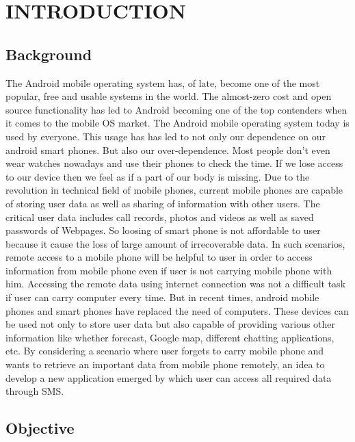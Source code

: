 

\chapter{INTRODUCTION}




\section{Background}

\hspace{0.9cm} The Android mobile operating system has, of late, become one of the most popular, free and usable systems in the world. The almost-zero cost and open source functionality has led to Android becoming one of the top contenders when it comes to the mobile OS market.
The Android mobile operating system today is used by everyone. This usage has has led to not only our dependence on our android smart phones. But also our over-dependence. Most people don’t even wear watches nowadays and use their phones to check the time. If we lose access to our device then we feel as if a part of our body is missing.
Due to the revolution in technical field of mobile phones, current mobile phones are capable of storing user data as well as sharing of information with other users. The critical user data includes call records, photos and videos as well as saved passwords of Webpages. So loosing of smart phone is not affordable to user because it cause the loss of large amount of irrecoverable data. In such scenarios, remote access to a mobile phone will be helpful to user in order to access information from mobile phone even if user is not carrying mobile phone with him. Accessing the remote data using internet connection was not a difficult task if user can carry computer every time. But in recent times, android mobile phones and smart phones have replaced the need of computers. These devices can be used not only to store user data but also capable of providing various other information like whether forecast, Google map, different chatting applications, etc. By considering a scenario where user forgets to carry mobile phone and wants to retrieve an important data from mobile phone remotely, an idea to develop a new application emerged by which user can access all required data through SMS.


\section{Objective}

